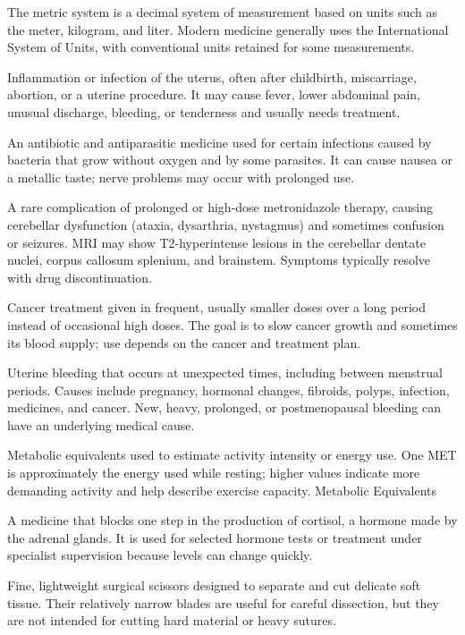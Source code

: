  The metric system is a decimal system of measurement based on units such as the meter, kilogram, and liter. Modern medicine generally uses the International System of Units, with conventional units retained for some measurements.

 Inflammation or infection of the uterus, often after childbirth, miscarriage, abortion, or a uterine procedure. It may cause fever, lower abdominal pain, unusual discharge, bleeding, or tenderness and usually needs treatment.

 An antibiotic and antiparasitic medicine used for certain infections caused by bacteria that grow without oxygen and by some parasites. It can cause nausea or a metallic taste; nerve problems may occur with prolonged use.

 A rare complication of prolonged or high-dose metronidazole therapy, causing cerebellar
dysfunction (ataxia, dysarthria, nystagmus) and sometimes confusion or seizures. MRI may
show T2-hyperintense lesions in the cerebellar dentate nuclei, corpus callosum splenium,
and brainstem. Symptoms typically resolve with drug discontinuation.

 Cancer treatment given in frequent, usually smaller doses over a long period instead of occasional high doses. The goal is to slow cancer growth and sometimes its blood supply; use depends on the cancer and treatment plan.

 Uterine bleeding that occurs at unexpected times, including between menstrual periods. Causes include pregnancy, hormonal changes, fibroids, polyps, infection, medicines, and cancer. New, heavy, prolonged, or postmenopausal bleeding can have an underlying medical cause.

 Metabolic equivalents used to estimate activity intensity or energy use. One MET is approximately the energy used while resting; higher values indicate more demanding activity and help describe exercise capacity.
\synonyms
Metabolic Equivalents

 A medicine that blocks one step in the production of cortisol, a hormone made by the adrenal glands. It is used for selected hormone tests or treatment under specialist supervision because levels can change quickly.

 Fine, lightweight surgical scissors designed to separate and cut delicate soft tissue. Their relatively narrow blades are useful for careful dissection, but they are not intended for cutting hard material or heavy sutures.

